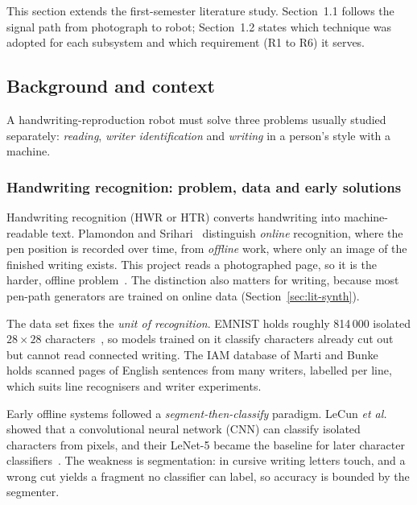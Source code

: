 \label{sec:literature}
This section extends the first-semester literature study. Section~1.1 follows the signal path from photograph to robot; Section~1.2 states which technique was adopted for each subsystem and which requirement (R1 to R6) it serves.

\subsection{Background and context}
\label{sec:lit-background}

A handwriting-reproduction robot must solve three problems usually studied separately: \emph{reading}, \emph{writer identification} and \emph{writing} in a person's style with a machine.

\subsubsection{Handwriting recognition: problem, data and early solutions}
\label{sec:lit-hwr}

Handwriting recognition (HWR or HTR) converts handwriting into machine-readable text. Plamondon and Srihari~\cite{plamondon2000} distinguish \emph{online} recognition, where the pen position is recorded over time, from \emph{offline} work, where only an image of the finished writing exists. This project reads a photographed page, so it is the harder, offline problem~\cite{plamondon2000}. The distinction also matters for writing, because most pen-path generators are trained on online data (Section~\ref{sec:lit-synth}).

The data set fixes the \emph{unit of recognition}. EMNIST holds roughly 814\,000 isolated $28\times28$ characters~\cite{chen2023}, so models trained on it classify characters already cut out but cannot read connected writing. The IAM database of Marti and Bunke~\cite{marti2002} holds scanned pages of English sentences from many writers, labelled per line, which suits line recognisers and writer experiments.

Early offline systems followed a \emph{segment-then-classify} paradigm. LeCun \emph{et al.}~\cite{lecun1998} showed that a convolutional neural network (CNN) can classify isolated characters from pixels, and their LeNet-5 became the baseline for later character classifiers~\cite{chen2023,ji2021,yahya2021,mamun2024}. The weakness is segmentation: in cursive writing letters touch, and a wrong cut yields a fragment no classifier can label, so accuracy is bounded by the segmenter.

